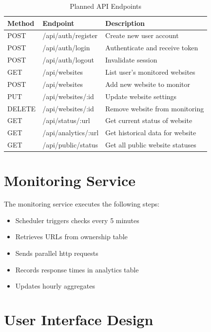 \begin{table}[htbp]
    \centering
    \caption{Planned API Endpoints}
    \label{tab:api-endpoints}
    \begin{tabular}{llp{6cm}}
        \toprule
        \textbf{Method} & \textbf{Endpoint} & \textbf{Description} \\
        \midrule
        POST & /api/auth/register & Create new user account \\
        POST & /api/auth/login & Authenticate and receive token \\
        POST & /api/auth/logout & Invalidate session \\
        \midrule
        GET & /api/websites & List user's monitored websites \\
        POST & /api/websites & Add new website to monitor \\
        PUT & /api/websites/:id & Update website settings \\
        DELETE & /api/websites/:id & Remove website from monitoring \\
        \midrule
        GET & /api/status/:url & Get current status of website \\
        GET & /api/analytics/:url & Get historical data for website \\
        GET & /api/public/status & Get all public website statuses \\
        \bottomrule
    \end{tabular}
\end{table}

\section{Monitoring Service}

The monitoring service executes the following steps:
\begin{itemize}
    \item Scheduler triggers checks every 5 minutes
    \item Retrieves URLs from ownership table
    \item Sends parallel \gls{http} requests
    \item Records response times in analytics table
    \item Updates hourly aggregates
\end{itemize}

\section{User Interface Design}

